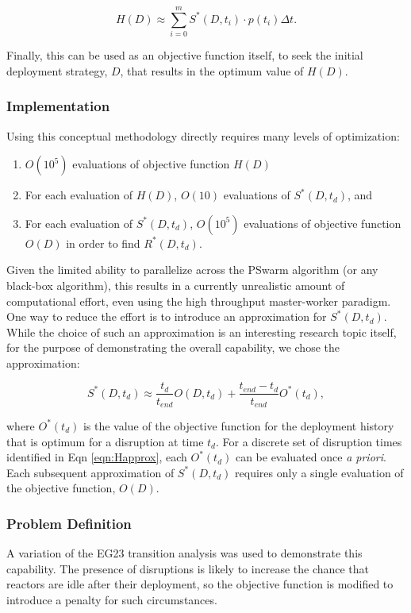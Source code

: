 \begin{equation}
  H(D) \approx \sum_{i=0}^m S^*(D,t_i) \cdot p(t_i) \Delta t. \label{eqn:Happrox}
\end{equation}

Finally, this can be used as an objective function itself, to seek the initial
deployment strategy, $D$, that results in the optimum value of $H(D)$.


\subsubsection{Implementation}

Using this conceptual methodology directly requires many levels of optimization:
\begin{enumerate}
\item $O(10^5)$ evaluations of objective function $H(D)$
\item For each evaluation of $H(D)$, $O(10)$ evaluations of $S^*(D,t_d)$, and
\item For each evaluation of $S^*(D,t_d)$, $O(10^5)$ evaluations of objective
  function $O(D)$ in order to find $R^*(D,t_d)$.
\end{enumerate}

Given the limited ability to parallelize across the PSwarm algorithm (or any
black-box algorithm), this results in a currently unrealistic amount of
computational effort, even using the high throughput master-worker paradigm.
One way to reduce the effort is to introduce an approximation for
$S^*(D,t_d)$.  While the choice of such an approximation is an interesting
research topic itself, for the purpose of demonstrating the overall
capability, we chose the approximation:

$$S^*(D,t_d) \approx \frac{t_d}{t_{end}} O(D,t_d) + \frac{t_{end}-t_d}{t_{end}} O^*(t_d),$$

\noindent where $O^*(t_d)$ is the value of the objective function for the
deployment history that is optimum for a disruption at time $t_d$.  For a
discrete set of disruption times identified in Eqn \ref{eqn:Happrox}, each
$O^*(t_d)$ can be evaluated once \textit{a priori}.  Each subsequent
approximation of $S^*(D,t_d)$ requires only a single evaluation of the
objective function, $O(D)$.


\subsubsection{Problem Definition}

A variation of the EG23 transition analysis was used to demonstrate this
capability.  The presence of disruptions is likely to increase the chance that
reactors are idle after their deployment, so the objective function is
modified to introduce a penalty for such circumstances.

